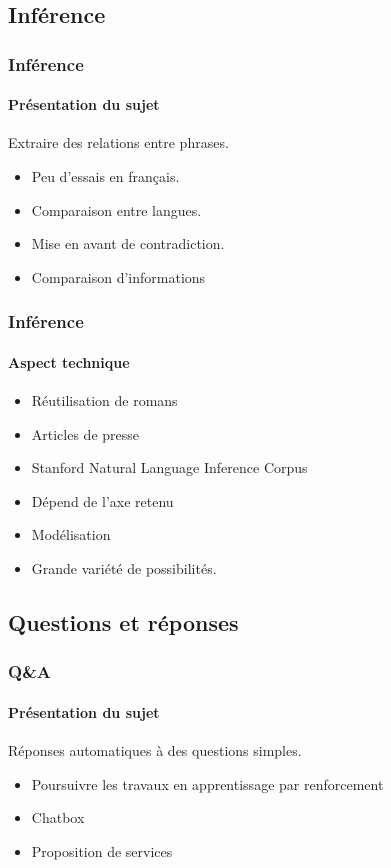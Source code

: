 \subsection{Inférence}
\begin{frame}
	\frametitle{Inférence}
	\framesubtitle{Présentation du sujet}

		Extraire des relations entre phrases.
	
		\begin{itemize}
			\item Peu d'essais en français.
			\item Comparaison entre langues.
		\end{itemize}

		\begin{itemize}
			\item Mise en avant de contradiction.
			\item Comparaison d'informations
		\end{itemize}
\end{frame}

\begin{frame}
	\frametitle{Inférence}
	\framesubtitle{Aspect technique}
		\begin{itemize}
			\item Réutilisation de romans
			\item Articles de presse
			\item Stanford Natural Language Inference Corpus
		\end{itemize}

		\begin{itemize}
			\item Dépend de l'axe retenu
			\item Modélisation
			\item Grande variété de possibilités.
		\end{itemize}
\end{frame}

\subsection{Questions et réponses}
\begin{frame}
	\frametitle{Q\&A}
	\framesubtitle{Présentation du sujet}
	
	Réponses automatiques à des questions simples.
	
		\begin{itemize}
			\item Poursuivre les travaux en apprentissage par renforcement
		\end{itemize}

		\begin{itemize}
			\item Chatbox
			\item Proposition de services
		\end{itemize}
\end{frame}

